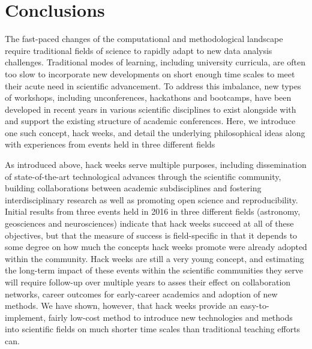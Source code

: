 
\section*{Conclusions}

The fast-paced changes of the computational and methodological landscape require traditional fields of science to rapidly adapt to new data analysis challenges.
Traditional modes of learning, including university curricula, are often too slow to incorporate new developments on short enough time scales to meet their acute need in scientific advancement.
To address this imbalance, new types of workshops, including unconferences, hackathons and bootcamps, have been developed in recent years in various scientific disciplines to exist alongside with and support the existing structure of academic conferences.
Here, we introduce one such concept, hack weeks, and detail the underlying philosophical ideas along with experiences from events held in three different fields

As introduced above, hack weeks serve multiple purposes, including dissemination of state-of-the-art technological advances through the scientific community, building collaborations between academic subdisciplines and fostering interdisciplinary research as well as  promoting open science and reproducibility.
Initial results from three events held in 2016 in three different fields (astronomy, geosciences and neurosciences) indicate that hack weeks succeed at all of these objectives, but that the measure of success is field-specific in that it depends to some degree on how much the concepts hack weeks promote were already adopted within the community.
Hack weeks are still a very young concept, and estimating the long-term impact of these events within the scientific communities they serve will require follow-up over multiple years to asses their effect on collaboration networks, career outcomes for early-career academics and adoption of new methods.
We have shown, however, that hack weeks provide an easy-to-implement, fairly low-cost method to introduce new technologies and methods into scientific fields on much shorter time scales than traditional teaching efforts can.
